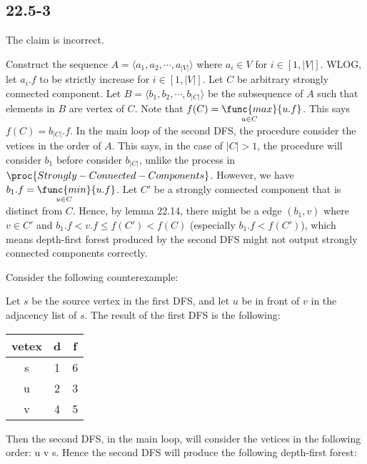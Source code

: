 \subsection*{22.5-3}

The claim is incorrect.

Construct the sequence $A = \langle a_1, a_2, \cdots, a_{|V|} \rangle$
where $a_i \in V$ for $i \in [1, |V|]$.
WLOG, let $a_i.f$ to be strictly increase for $i \in [1, |V|]$.
Let $C$ be arbitrary strongly connected component.
Let $B = \langle b_1, b_2, \cdots, b_{|C|} \rangle$ be the subsequence of $A$
such that elements in $B$ are vertex of $C$.
Note that $f(C) = \mathop{\func{max}}\limits_{u \in C} \{ u.f \}$.
This says $f(C) = b_{|C|}.f$.
In the main loop of the second DFS,
the procedure consider the vetices in the order of $A$.
This says, in the case of $|C| > 1$,
the procedure will consider $b_1$ before consider $b_{|C|}$,
unlike the process in $\proc{Strongly-Connected-Components}$.
However, we have $b_1.f = \mathop{\func{min}}\limits_{u \in C} \{ u.f \}$.
Let $C'$ be a strongly connected component that is distinct from $C$.
Hence, by lemma 22.14, there might be a edge $(b_1, v)$ where $v \in C'$
and $b_1.f < v.f \leq f(C') < f(C)$ (especially $b_1.f < f(C')$),
which means depth-first forest produced by the second DFS
might not output strongly connected components correctly.

Consider the following counterexample:


Let $s$ be the source vertex in the first DFS, 
and let $u$ be in front of $v$ in the adjacency list of $s$.
The result of the first DFS is the following:

\begin{tabular}{c|c|c}
    vetex & d & f \\
    \hline
    s & 1 & 6 \\
    u & 2 & 3 \\
    v & 4 & 5 \\
\end{tabular}

Then the second DFS, in the main loop, 
will consider the vetices in the following order:
u v s.
Hence the second DFS will produce the following depth-first forest:

